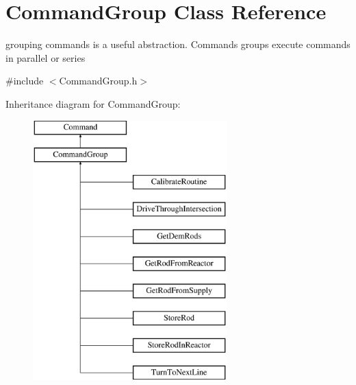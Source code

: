 \hypertarget{classCommandGroup}{\section{Command\-Group Class Reference}
\label{classCommandGroup}
}


grouping commands is a useful abstraction. Commands groups execute commands in parallel or series  




{\ttfamily \#include $<$Command\-Group.\-h$>$}

Inheritance diagram for Command\-Group\-:\begin{figure}[H]
\begin{center}
\leavevmode
\includegraphics[height=10.000000cm]{classCommandGroup}
\end{center}
\end{figure}
